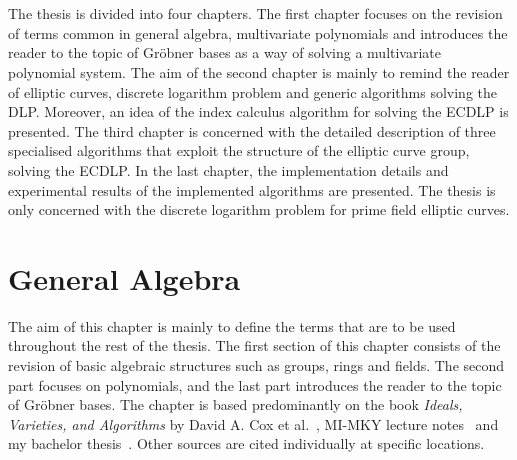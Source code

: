 \documentclass[thesis=M,english]{FITthesis}[2012/10/20]
\theoremstyle{remark}
\theoremstyle{definition}
\begin{document}
\\ \\
\noindent The thesis is divided into four chapters. The first chapter focuses on the revision of terms common in general algebra, multivariate polynomials and introduces the reader to the topic of Gröbner bases as a way of solving a multivariate polynomial system. The aim of the second chapter is mainly to remind the reader of elliptic curves, discrete logarithm problem and generic algorithms solving the DLP. Moreover, an idea of the index calculus algorithm for solving the ECDLP is presented. The third chapter is concerned with the detailed description of three specialised algorithms that exploit the structure of the elliptic curve group, solving the ECDLP. In the last chapter, the implementation details and experimental results of the implemented algorithms are presented. The thesis is only concerned with the discrete logarithm problem for prime field elliptic curves.

\chapter{General Algebra}\label{mathBG}
%
The aim of this chapter is mainly to define the terms that are to be used throughout the rest of the thesis. The first section of this chapter consists of the revision of basic algebraic structures such as groups, rings and fields. The second part focuses on polynomials, and the last part introduces the reader to the topic of Gröbner bases. The chapter is based predominantly on the book \textit{Ideals, Varieties, and Algorithms} by David A. Cox et al.~\cite{algGeom}, MI-MKY lecture notes~\cite{mky} and my bachelor thesis~\cite{myBP}. Other sources are cited individually at specific locations.
\end{document}
